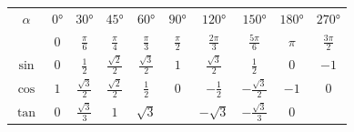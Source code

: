 \footnotesize
\begin{tabular}{c|c|c|c|c|c|c|c|c|c}
    $\alpha$ & $0$° &  $30$° & $45$° & $60$° & $90$° & $120$° & $150$° & $180$° & $270$° \\
           & $0$ & $\frac{\pi}{6}$ & $\frac{\pi}{4}$ & $\frac{\pi}{3}$ & $\frac{\pi}{2}$ & $\frac{2\pi}{3}$ & $\frac{5\pi}{6}$ & $\pi$ & $\frac{3\pi}{2}$\\
    \hline
    $\sin$ & $0$ & $\frac{1}{2}$ & $\frac{\sqrt{2}}{2}$ & $\frac{\sqrt{3}}{2}$ & $1$ & $\frac{\sqrt{3}}{2}$ & $\frac{1}{2}$ & $0$ & $-1$\\ 
    \hline
    $\cos$ & $1$ & $\frac{\sqrt{3}}{2}$ & $\frac{\sqrt{2}}{2}$ & $\frac{1}{2}$ & $0$ & $-\frac{1}{2}$ & $-\frac{\sqrt{3}}{2}$ & $-1$ & $0$\\
    \hline
    $\tan$ & $0$ & $\frac{\sqrt{3}}{3}$ & $1$ & $\sqrt{3}$ & & $-\sqrt{3}$ & $-\frac{\sqrt{3}}{3}$ & $0$ & \\
\end{tabular}
\normalsize


\newpage
